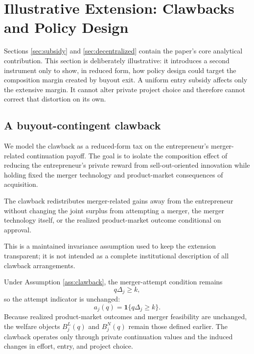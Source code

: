\section{Illustrative Extension: Clawbacks and Policy Design}\label{sec:extensions}

Sections \ref{sec:subsidy} and \ref{sec:decentralized} contain the paper's core analytical contribution. This section is deliberately illustrative: it introduces a second instrument only to show, in reduced form, how policy design could target the composition margin created by buyout exit. A uniform entry subsidy affects only the extensive margin. It cannot alter private project choice and therefore cannot correct that distortion on its own.

\subsection{A buyout-contingent clawback}

We model the clawback as a reduced-form tax on the entrepreneur's merger-related continuation payoff. The goal is to isolate the composition effect of reducing the entrepreneur's private reward from sell-out-oriented innovation while holding fixed the merger technology and product-market consequences of acquisition.

\begin{assumption}\label{ass:clawback}
The clawback redistributes merger-related gains away from the entrepreneur without changing the joint surplus from attempting a merger, the merger technology itself, or the realized product-market outcome conditional on approval.
\end{assumption}
This is a maintained invariance assumption used to keep the extension transparent; it is not intended as a complete institutional description of all clawback arrangements.

Under Assumption \ref{ass:clawback}, the merger-attempt condition remains
\begin{equation}\label{eq:attemptconditionrho}
    q\Delta_j \ge k,
\end{equation}
so the attempt indicator is unchanged:
\begin{equation}
    a_j(q)=\mathbf{1}\{q\Delta_j \ge k\}.
\end{equation}
Because realized product-market outcomes and merger feasibility are unchanged, the welfare objects \(B_j^L(q)\) and \(B_j^N(q)\) remain those defined earlier. The clawback operates only through private continuation values and the induced changes in effort, entry, and project choice.

